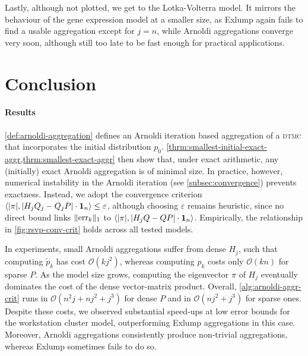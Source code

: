 \documentclass[runningheads]{llncs}
\newcommand*{\errvec}{\mathrm{err}}
\newcommand*{\abbrev}[1]{\textsc{#1}}
\DeclarePairedDelimiter{\abs}{\lvert}{\rvert}
\DeclarePairedDelimiter{\norm}{\lVert}{\rVert}
\DeclarePairedDelimiter{\inp}{\langle}{\rangle}
\begin{document}
Lastly, although not plotted, we get to the Lotka-Volterra model.
It mirrors the behaviour of the gene expression model at a smaller size, as Exlump again fails to find a usable aggregation except for $j = n$, while Arnoldi aggregations converge very soon, although still too late to be fast enough for practical applications.

\section{Conclusion}\label{sec:conclusion}
\paragraph{Results}
\cref{def:arnoldi-aggregation} defines an Arnoldi iteration based aggregation of a \abbrev{dtmc} that incorporates the initial distribution $p_0$.
\cref{thrm:smallest-initial-exact-aggr,thrm:smallest-exact-aggr} then show that, under exact arithmetic, any (initially) exact Arnoldi aggregation is of minimal size.
In practice, however, numerical instability in the Arnoldi iteration (see \cref{subsec:convergence}) prevents exactness.
Instead, we adopt the convergence criterion $\inp*{\abs*{\pi}, \abs*{H_j Q_j - Q_j P} \cdot \mathbf{1}_n} \leq \varepsilon$, although choosing $\varepsilon$ remains heuristic, since no direct bound links $\norm{\errvec_k}_1$ to $\inp*{\abs*{\pi}, \abs*{H_j Q - Q P} \cdot \mathbf{1}_n}$.
Empirically, the relationship in \cref{fig:rsvp-conv-crit} holds across all tested models.

In experiments, small Arnoldi aggregations suffer from dense $H_j$, such that computing $\tilde p_k$ has cost $\mathcal O(kj^2)$, whereas computing $p_k$ costs only $\mathcal O(kn)$ for sparse $P$.
As the model size grows, computing the eigenvector $\pi$ of $H_j$ eventually dominates the cost of the dense vector-matrix product.
Overall, \cref{alg:arnoldi-aggr-crit} runs in $\mathcal{O}(n^2j + nj^2 + j^3)$ for dense $P$ and in $\mathcal O(nj^2 + j^3)$ for sparse ones.
Despite these costs, we observed substantial speed‑ups at low error bounds for the workstation cluster model, outperforming Exlump aggregations in this case.
Moreover, Arnoldi aggregations consistently produce non‑trivial aggregations, whereas Exlump sometimes fails to do so.
\end{document}
